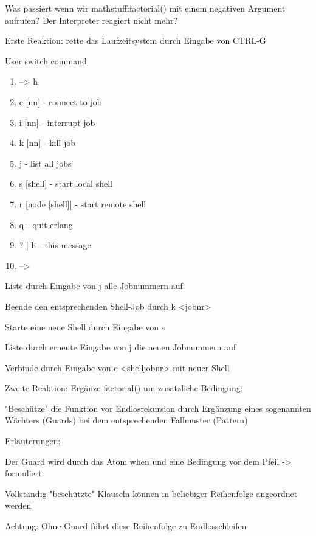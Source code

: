 \documentclass[10pt]{article}
\begin{document}
Was passiert wenn wir mathstuff:factorial() mit einem negativen Argument aufrufen? Der Interpreter reagiert nicht mehr?
\begin{itemize*}
  \item Erste Reaktion: rette das Laufzeitsystem durch Eingabe von CTRL-G
  \begin{itemize*}
    \item User switch command
    \begin{enumerate}
      \item --> h
      \item  c [nn] - connect to job
      \item i [nn] - interrupt job
      \item k [nn] - kill job
      \item j - list all jobs
      \item s [shell] - start local shell
      \item r [node [shell]] - start remote shell
      \item q - quit erlang
      \item ? | h - this message
      \item -->
    \end{enumerate}
    \item Liste durch Eingabe von j alle Jobnummern auf
    \item Beende den entsprechenden Shell-Job durch k <jobnr>
    \item Starte eine neue Shell durch Eingabe von s
    \item Liste durch erneute Eingabe von j die neuen Jobnummern auf
    \item Verbinde durch Eingabe von c <shelljobnr> mit neuer Shell
  \end{itemize*}
  \item Zweite Reaktion: Ergänze factorial() um zusätzliche Bedingung:
  \begin{itemize*}
    \item "Beschütze" die Funktion vor Endlosrekursion durch Ergänzung eines sogenannten Wächters (Guards) bei dem entsprechenden Fallmuster  (Pattern)
    \item Erläuterungen:
    \begin{itemize*}
      \item Der Guard wird durch das Atom when und eine Bedingung vor dem Pfeil -> formuliert
      \item Vollständig "beschützte" Klauseln können in beliebiger Reihenfolge angeordnet werden
      \item Achtung: Ohne Guard führt diese Reihenfolge zu Endlosschleifen

\end{itemize*}
\end{itemize*}
\end{itemize*}
\end{document}
